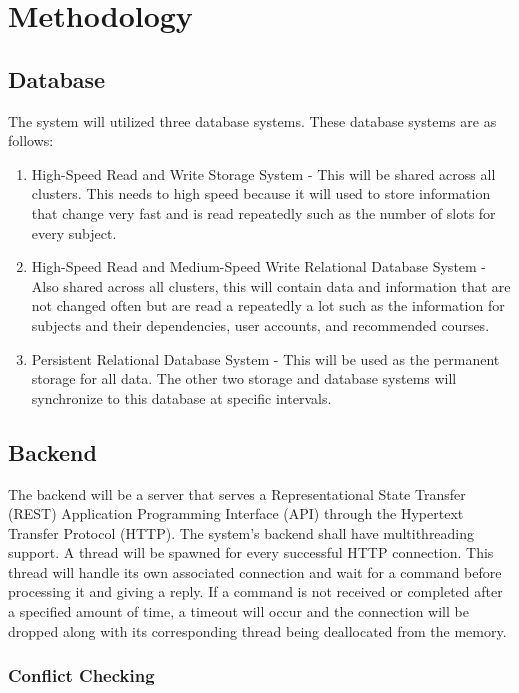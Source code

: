 \documentclass{sigchi}
\begin{document}
\section{Methodology}

\subsection{Database}

The system will utilized three database systems. These database systems are as
follows:
\begin{enumerate}
\item High-Speed Read and Write Storage System - This will be shared across all
clusters. This needs to high speed because it will used to store information
that change very fast and is read repeatedly such as the number of slots for
every subject.

\item High-Speed Read and Medium-Speed Write Relational Database System - Also 
shared across all clusters, this will contain data and information that are not
changed often but are read a repeatedly a lot such as the information for subjects
and their dependencies, user accounts, and recommended courses.

\item Persistent Relational Database System - This will be used as the permanent
storage for all data. The other two storage and database systems will synchronize
to this database at specific intervals.
\end{enumerate}



\subsection{Backend}

The backend will be a server that serves a Representational State Transfer (REST)
Application Programming Interface (API) through the Hypertext Transfer Protocol
(HTTP). The system's backend shall have multithreading support. A thread will be 
spawned for every successful HTTP connection. This thread will handle its own
associated connection and wait for a command before processing it and giving a 
reply. If a command is not received or completed after a specified amount of
time, a timeout will occur and the connection will be dropped along with its
corresponding thread being deallocated from the memory. 

\subsubsection{Conflict Checking}
\end{document}
